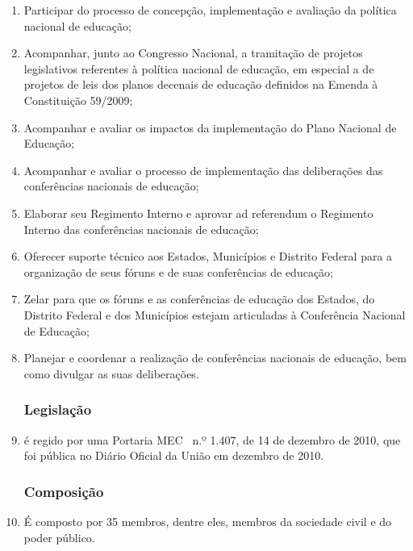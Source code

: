 \begin{enumerate}
\item 
Participar do processo de concepção, implementação e
avaliação da política nacional de educação;
\item 
Acompanhar, junto ao Congresso Nacional, a tramitação de projetos
legislativos referentes à política nacional de educação, em
especial a de projetos de leis dos planos decenais de educação
definidos na Emenda à Constituição 59/2009;
\item 
Acompanhar e avaliar os impactos da implementação do Plano
Nacional de Educação;
\item 
Acompanhar e avaliar o processo de implementação das
deliberações das conferências nacionais de educação;
\item 
Elaborar seu Regimento Interno e aprovar ad
referendum o Regimento Interno das conferências
nacionais de educação;
\item 
Oferecer suporte técnico aos Estados, Municípios e Distrito Federal
para a organização de seus fóruns e de suas conferências de
educação;
\item 
Zelar para que os fóruns e as conferências de educação dos
Estados, do Distrito Federal e dos Municípios estejam articuladas à
Conferência Nacional de Educação;
\item 
Planejar e coordenar a realização de conferências nacionais de
educação, bem como divulgar as suas deliberações.


\subsubsection*{Legislação}
\item 
é regido por uma Portaria MEC \ n.º 1.407, de 14 de
dezembro de 2010, que foi pública no Diário Oficial da União em
dezembro de 2010.

\subsubsection*{Composição}
\item 
É composto por 35 membros, dentre eles, membros da sociedade civil e
do poder público.
\end{enumerate}
